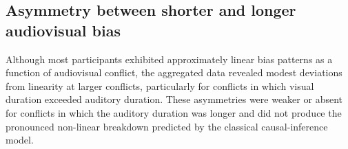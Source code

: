 \documentclass{jov}
\begin{document}



\subsection{Asymmetry between shorter and longer audiovisual bias}

Although most participants exhibited approximately linear bias patterns as a function of audiovisual conflict, the aggregated data revealed modest deviations from linearity at larger conflicts, particularly for conflicts in which visual duration exceeded auditory duration. These asymmetries were weaker or absent for conflicts in which the auditory duration was longer and did not produce the pronounced non-linear breakdown predicted by the classical causal-inference model.
\end{document}
